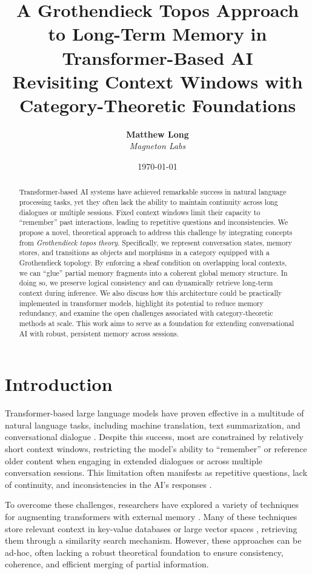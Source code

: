 \documentclass{article}
\title{%
A Grothendieck Topos Approach to Long-Term Memory in Transformer-Based AI \\
\large Revisiting Context Windows with Category-Theoretic Foundations
}
\author{
  \textbf{Matthew Long}\\
  \textit{Magneton Labs} \\
}
\date{\today}
\begin{document}
\maketitle

\begin{abstract}
Transformer-based AI systems have achieved remarkable success in natural language processing tasks, yet they often lack the ability to maintain continuity across long dialogues or multiple sessions. Fixed context windows limit their capacity to ``remember'' past interactions, leading to repetitive questions and inconsistencies. We propose a novel, theoretical approach to address this challenge by integrating concepts from \emph{Grothendieck topos theory}. Specifically, we represent conversation states, memory stores, and transitions as objects and morphisms in a category equipped with a Grothendieck topology. By enforcing a sheaf condition on overlapping local contexts, we can ``glue'' partial memory fragments into a coherent global memory structure. In doing so, we preserve logical consistency and can dynamically retrieve long-term context during inference. We also discuss how this architecture could be practically implemented in transformer models, highlight its potential to reduce memory redundancy, and examine the open challenges associated with category-theoretic methods at scale. This work aims to serve as a foundation for extending conversational AI with robust, persistent memory across sessions.
\end{abstract}

\tableofcontents

\section{Introduction}
\label{sec:intro}

Transformer-based large language models have proven effective in a multitude of natural language tasks, including machine translation, text summarization, and conversational dialogue \citep{vaswani2017attention, devlin2019bert, brown2020language}. Despite this success, most are constrained by relatively short context windows, restricting the model's ability to ``remember'' or reference older content when engaging in extended dialogues or across multiple conversation sessions. This limitation often manifests as repetitive questions, lack of continuity, and inconsistencies in the AI’s responses \citep{roller2021recipes}.

To overcome these challenges, researchers have explored a variety of techniques for augmenting transformers with external memory \citep{weston2014memory, sukhbaatar2015end}. Many of these techniques store relevant context in key-value databases or large vector spaces \citep{lewis2020retrieval, kara2022reducing}, retrieving them through a similarity search mechanism. However, these approaches can be ad-hoc, often lacking a robust theoretical foundation to ensure consistency, coherence, and efficient merging of partial information.
\end{document}
